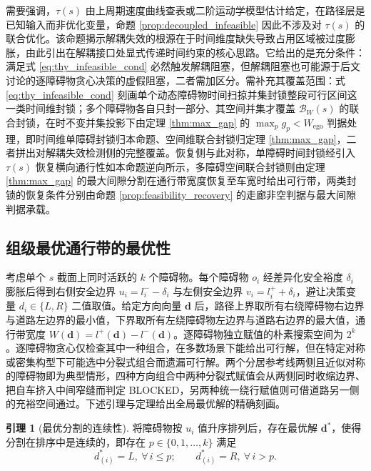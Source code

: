 \documentclass[a4paper,11pt]{ctexart}
\theoremstyle{definition}
\newtheorem{lemma}{引理}[section]
\begin{document}
需要强调，$\tau(s)$ 由上周期速度曲线查表或二阶运动学模型估计给定，在路径层是已知输入而非优化变量，命题 \ref{prop:decoupled_infeasible} 因此不涉及对 $\tau(s)$ 的联合优化。该命题揭示解耦失效的根源在于时间维度缺失导致占用区域被过度膨胀，由此引出在解耦接口处显式传递时间约束的核心思路。它给出的是充分条件：满足式 \eqref{eq:thy_infeasible_cond} 必然触发解耦阻塞，但解耦阻塞也可能源于后文讨论的逐障碍物贪心决策的虚假阻塞，二者需加区分。需补充其覆盖范围：式 \eqref{eq:thy_infeasible_cond} 刻画单个动态障碍物时间扫掠并集封锁整段可行区间这一类时间维封锁；多个障碍物各自只封一部分、其空间并集才覆盖 $\mathcal{B}_{W}(s)$ 的联合封锁，在时不变并集投影下由定理 \ref{thm:max_gap} 的 $\max_p g_p < W_{\text{ego}}$ 判据处理，即时间维单障碍封锁归本命题、空间维联合封锁归定理 \ref{thm:max_gap}，二者拼出对解耦失效检测侧的完整覆盖。恢复侧与此对称，单障碍时间封锁经引入 $\tau(s)$ 恢复横向通行性如本命题逆向所示，多障碍空间联合封锁则由定理 \ref{thm:max_gap} 的最大间隙分割在通行带宽度恢复至车宽时给出可行带，两类封锁的恢复条件分别由命题 \ref{prop:feasibility_recovery} 的走廊非空判据与最大间隙判据承载。

\subsection{组级最优通行带的最优性}
\label{sec:thy_max_gap}

考虑单个 $s$ 截面上同时活跃的 $k$ 个障碍物。每个障碍物 $o_i$ 经差异化安全裕度 $\delta_i$ 膨胀后得到右侧安全边界 $u_i = l_i^{-} - \delta_i$ 与左侧安全边界 $v_i = l_i^{+} + \delta_i$，避让决策变量 $d_i \in \{L, R\}$ 二值取值。给定方向向量 $\mathbf{d}$ 后，路径上界取所有右绕障碍物右边界与道路左边界的最小值，下界取所有左绕障碍物左边界与道路右边界的最大值，通行带宽度 $W(\mathbf{d}) = l^{+}(\mathbf{d}) - l^{-}(\mathbf{d})$。逐障碍物独立赋值的朴素搜索空间为 $2^k$。逐障碍物贪心仅检查其中一种组合，在多数场景下能给出可行解，但在特定对称或密集构型下可能选中分裂式组合而遗漏可行解。两个分居参考线两侧且近似对称的障碍物即为典型情形，四种方向组合中两种分裂式赋值会从两侧同时收缩边界、把自车挤入中间窄缝而判定 BLOCKED，另两种统一绕行赋值则可借道路另一侧的充裕空间通过。下述引理与定理给出全局最优解的精确刻画。

\begin{lemma}[最优分割的连续性]
\label{lem:continuous_partition}
将障碍物按 $u_i$ 值升序排列后，存在最优解 $\mathbf{d}^{*}$，使得分割在排序中是连续的，即存在 $p \in \{0, 1, \ldots, k\}$ 满足
\begin{equation}
    d_{(i)}^{*} = L,\ \forall\, i \leq p; \qquad d_{(i)}^{*} = R,\ \forall\, i > p.
    \label{eq:continuous_partition}
\end{equation}
\end{lemma}
\end{document}

